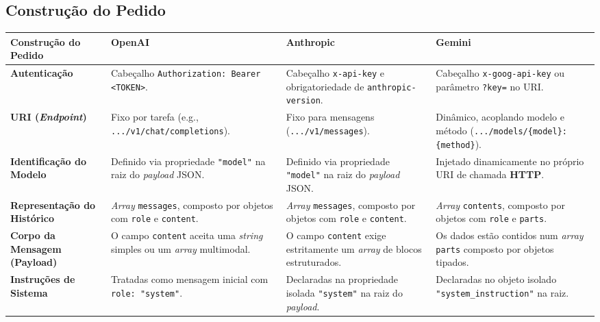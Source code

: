 \subsection{Construção do Pedido}

\begin{table}[H]
    \centering
    \footnotesize
    \renewcommand{\arraystretch}{1.4}
    \begin{tabularx}{\textwidth}{|>{\raggedright\arraybackslash}p{2.8cm}|Y|Y|Y|}
        \hline
        \textbf{Construção do Pedido} & \textbf{OpenAI} & \textbf{Anthropic} & \textbf{Gemini} \\
        \hline
        \textbf{Autenticação} & Cabeçalho \texttt{Authorization: Bearer <TOKEN>}. & Cabeçalho \texttt{x-api-key} e obrigatoriedade de \texttt{anthropic-}\allowbreak\texttt{version}. & Cabeçalho \texttt{x-goog-api-key} ou parâmetro \texttt{?key=} no URI. \\
        \hline
        \textbf{URI (\textit{Endpoint})} & Fixo por tarefa (e.g., \texttt{.../v1/chat/}\allowbreak\texttt{completions}). & Fixo para mensagens (\texttt{.../v1/messages}). & Dinâmico, acoplando modelo e método (\texttt{.../models/}\allowbreak\texttt{\{model\}:\{method\}}). \\
        \hline
        \textbf{Identificação do Modelo} & Definido via propriedade \texttt{"model"} na raiz do \textit{payload} JSON. & Definido via propriedade \texttt{"model"} na raiz do \textit{payload} JSON. & Injetado dinamicamente no próprio URI de chamada \textbf{HTTP}. \\
        \hline
        \textbf{Representação do Histórico} & \textit{Array} \texttt{messages}, composto por objetos com \texttt{role} e \texttt{content}. & \textit{Array} \texttt{messages}, composto por objetos com \texttt{role} e \texttt{content}. & \textit{Array} \texttt{contents}, composto por objetos com \texttt{role} e \texttt{parts}. \\
        \hline
        \textbf{Corpo da Mensagem (Payload)} & O campo \texttt{content} aceita uma \textit{string} simples ou um \textit{array} multimodal. & O campo \texttt{content} exige estritamente um \textit{array} de blocos estruturados. & Os dados estão contidos num \textit{array} \texttt{parts} composto por objetos tipados. \\
        \hline
        \textbf{Instruções de Sistema} & Tratadas como mensagem inicial com \texttt{role: "system"}. & Declaradas na propriedade isolada \texttt{"system"} na raiz do \textit{payload}. & Declaradas no objeto isolado \texttt{"system\_}\allowbreak\texttt{instruction"} na raiz. \\

\end{tabularx}
\end{table}
